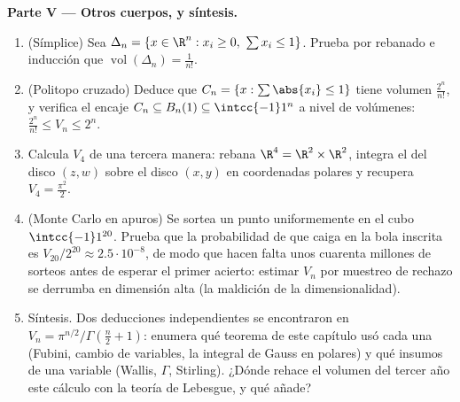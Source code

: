 \begin{problem}[{Problema de fin de semana --- $V_n =
\pi^{n/2}/\Gamma(\frac n2 + 1)$, y la rareza de las dimensiones
altas}]
\medskip
\noindent\textbf{Parte V --- Otros cuerpos, y síntesis.}
\begin{enumerate}[resume]
  \item (Símplice) Sea $\Delta_n = \{x \in \R^n : x_i \geq 0,\ \sum
        x_i \leq 1\}$. Prueba por rebanado e inducción que
        $\operatorname{vol}(\Delta_n) = \frac1{n!}$.
  \item (Politopo cruzado) Deduce que $C_n = \{x : \sum\abs{x_i}
        \leq 1\}$ tiene volumen $\frac{2^n}{n!}$, y verifica el
        encaje $C_n \subseteq B_n(1) \subseteq \intcc{-1}1^n$ a
        nivel de volúmenes: $\frac{2^n}{n!} \leq V_n \leq 2^n$.
  \item Calcula $V_4$ de una tercera manera: rebana $\R^4 = \R^2
        \times \R^2$, integra el  del disco $(z, w)$ sobre el
        disco $(x, y)$ en coordenadas polares y recupera $V_4 =
        \frac{\pi^2}2$.
  \item (Monte Carlo en apuros) Se sortea un punto uniformemente en
        el cubo $\intcc{-1}1^{20}$. Prueba que la probabilidad de que
        caiga en la bola inscrita es $V_{20}/2^{20} \approx
        2.5\cdot10^{-8}$, de modo que hacen falta unos cuarenta
        millones de sorteos antes de esperar el primer acierto:
        estimar $V_n$ por muestreo de rechazo se derrumba en
        dimensión alta (la maldición de la dimensionalidad).
  \item Síntesis. Dos deducciones independientes se encontraron en
        $V_n = \pi^{n/2}/\Gamma(\frac n2 + 1)$: enumera qué teorema
        de este capítulo usó cada una (Fubini, cambio de variables,
        la integral de Gauss en polares) y qué insumos de una
        variable (Wallis, $\Gamma$, Stirling). ¿Dónde rehace el
        volumen del tercer año este cálculo con la teoría de
        Lebesgue, y qué añade?
\end{enumerate}
\end{problem}

